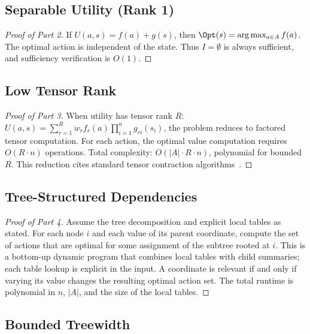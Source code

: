 \subsection{Separable Utility (Rank 1)}

\begin{proof}[Proof of Part 2]
If $U(a, s) = f(a) + g(s)$, then $\Opt(s) = \arg\max_{a \in A} f(a)$. The optimal action is independent of the state. Thus $I = \emptyset$ is always sufficient, and sufficiency verification is $O(1)$.
\end{proof}

\subsection{Low Tensor Rank}

\begin{proof}[Proof of Part 3]
When utility has tensor rank $R$: $U(a,s) = \sum_{r=1}^R w_r f_r(a) \prod_{i=1}^n g_{ri}(s_i)$, the problem reduces to factored tensor computation. For each action, the optimal value computation requires $O(R \cdot n)$ operations. Total complexity: $O(|A| \cdot R \cdot n)$, polynomial for bounded $R$. This reduction cites standard tensor contraction algorithms~\cite{kolda2009tensor, cichocki2016tensor}.
\end{proof}

\subsection{Tree-Structured Dependencies}

\begin{proof}[Proof of Part 4]
Assume the tree decomposition and explicit local tables as stated. For each node $i$ and each value of its parent coordinate, compute the set of actions that are optimal for some assignment of the subtree rooted at $i$. This is a bottom-up dynamic program that combines local tables with child summaries; each table lookup is explicit in the input. A coordinate is relevant if and only if varying its value changes the resulting optimal action set. The total runtime is polynomial in $n$, $|A|$, and the size of the local tables.
\end{proof}

\subsection{Bounded Treewidth}

